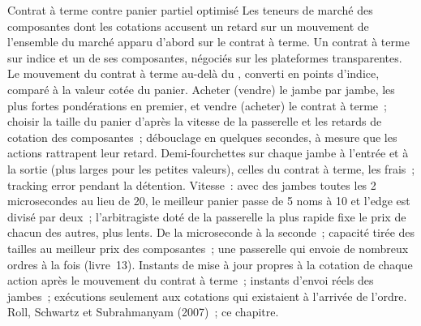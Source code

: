 \begin{strategyfile}{Contrat à terme contre panier partiel optimisé}\label{strat:hf:index-and-basket-arbitrage:partial}
 Les teneurs de marché des composantes dont les cotations accusent un retard sur un mouvement de l'ensemble du marché apparu d'abord sur le contrat à terme.
 Un contrat à terme sur indice et un  de ses composantes, négociés sur les plateformes transparentes.
 Le mouvement du contrat à terme au-delà du , converti en points d'indice, comparé à la valeur cotée du panier.
 Acheter (vendre) le  jambe par jambe, les plus fortes pondérations en premier, et vendre (acheter) le contrat à terme~; choisir la taille du panier
d'après la vitesse de la passerelle et les retards de cotation des composantes~; débouclage en quelques secondes, à mesure que les actions rattrapent leur retard.
 Demi-fourchettes sur chaque jambe à l'entrée et à la sortie (plus larges pour les petites valeurs), celles du contrat à terme, les frais~; tracking error pendant la détention.
 Vitesse~: avec des jambes toutes les 2 microsecondes au lieu de 20, le meilleur panier passe de 5 noms à 10 et l'edge est divisé
par deux~; l'arbitragiste doté de la passerelle la plus rapide fixe le prix de chacun des autres, plus lents.
 De la microseconde à la seconde~; capacité tirée des tailles au meilleur prix des composantes~; une passerelle qui envoie de nombreux
ordres à la fois (livre~13).
 Instants de mise à jour propres à la cotation de chaque action après le mouvement du contrat à terme~; instants d'envoi réels des jambes~; exécutions seulement aux cotations
qui existaient à l'arrivée de l'ordre.
 Roll, Schwartz et Subrahmanyam (2007)~; ce chapitre.
\end{strategyfile}

